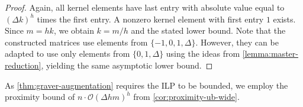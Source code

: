 \documentclass[a4paper,UKenglish,cleveref,thm-restate]{lipics-v2021}
\renewcommand{\O}{\mathcal O}
\begin{document}
{\begin{proof}
    Again, all kernel elements have last entry with absolute value equal to $(\Delta k)^h$ times the first entry. A nonzero kernel element with first entry $1$ exists. Since $m=hk$, we obtain $k=m/h$ and the stated lower bound. Note that the constructed matrices use elements from $\{-1,0,1,\Delta\}$. However, they can be adapted to use only elements from $\{0,1,\Delta\}$ using the ideas from \cref{lemma:master-reduction}, yielding the same asymptotic lower bound.
\end{proof}

}

As \cref{thm:graver-augmentation} requires the ILP to be bounded, we employ the proximity bound of $n\cdot\O(\Delta hm)^h$ from \cref{cor:proximity-ub-wide}. \iftoggle{ea}{Both the Graver complexity and proximity bounds can be used in conjunction with \cref{thm:graver-augmentation} to reduce the problem of solving \cref{ilp:wide} to computing a number of Graver-best steps.}{Before showing how these two results allow us to reduce \cref{ilp:wide} to finding solutions to a constrained $b$-matching problem with small $b$, we show that the proximity upper bound is tight when $n=\Theta(m)$ and $h$ is constant.

\propproximitylbwide*

}
\end{document}
